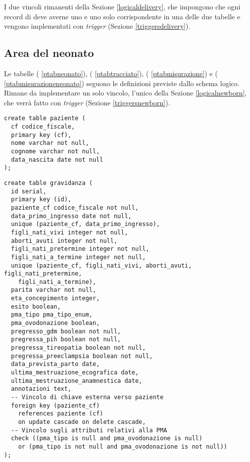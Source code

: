 I due vincoli rimanenti della Sezione \ref{logicaldelivery}, che impongono che ogni record di  deve averne uno e uno solo corrispondente in una delle due tabelle  e  vengono implementati con \emph{trigger} (Sezione \ref{triggersdelivery}).

\subsection{Area del neonato}

Le tabelle  (\lstlistingname{} \ref{ptabneonato}),  (\lstlistingname{} \ref{ptabtracciato}),  (\lstlistingname{} \ref{ptabmisurazione}) e\linebreak {} (\lstlistingname{} \ref{ptabmisurazioneneonato}) seguono le definizioni previste dallo schema logico.
Rimane da implementare un solo vincolo, l'unico della Sezione \ref{logicalnewborn}, che verrà fatto con \emph{trigger} (Sezione \ref{triggersnewborn}).

\FloatBarrier

\begin{lstlisting}[float,caption={Definizione della tabella \tab{paziente}.},label=ptabpaziente]
create table paziente (
  cf codice_fiscale,
  primary key (cf),
  nome varchar not null,
  cognome varchar not null,
  data_nascita date not null
);
\end{lstlisting}

\begin{lstlisting}[float,caption={Definizione della tabella \tab{gravidanza}.},label=ptabgravidanza]
create table gravidanza (
  id serial,
  primary key (id),
  paziente_cf codice_fiscale not null,
  data_primo_ingresso date not null,
  unique (paziente_cf, data_primo_ingresso),
  figli_nati_vivi integer not null,
  aborti_avuti integer not null,
  figli_nati_pretermine integer not null,
  figli_nati_a_termine integer not null,
  unique (paziente_cf, figli_nati_vivi, aborti_avuti, figli_nati_pretermine,
    figli_nati_a_termine),
  parita varchar not null,
  eta_concepimento integer,
  esito boolean,
  pma_tipo pma_tipo_enum,
  pma_ovodonazione boolean,
  pregresso_gdm boolean not null,
  pregressa_pih boolean not null,
  pregressa_tireopatia boolean not null,
  pregressa_preeclampsia boolean not null,
  data_prevista_parto date,
  ultima_mestruazione_ecografica date,
  ultima_mestruazione_anamnestica date,
  annotazioni text,
  -- Vincolo di chiave esterna verso paziente
  foreign key (paziente_cf)
    references paziente (cf)
    on update cascade on delete cascade,
  -- Vincolo sugli attributi relativi alla PMA
  check ((pma_tipo is null and pma_ovodonazione is null)
    or (pma_tipo is not null and pma_ovodonazione is not null))
);
\end{lstlisting}

